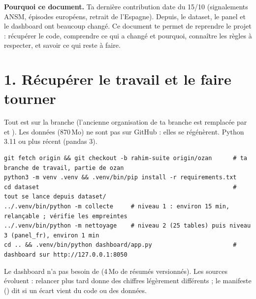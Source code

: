 \textbf{Pourquoi ce document.} Ta dernière contribution date du 15/10 (signalements ANSM, épisodes européens, retrait de l'Espagne).
Depuis, le dataset, le panel et le dashboard ont beaucoup changé. Ce document te permet de reprendre le projet : récupérer le code,
comprendre ce qui a changé et pourquoi, connaître les règles à respecter, et savoir ce qui reste à faire.

\section{1. Récupérer le travail et le faire tourner}
Tout est sur la branche  (l'ancienne organisation de ta branche est remplacée par  et ).
Les données (870\,Mo) ne sont pas sur GitHub : elles se régénèrent. Python 3.11 ou plus récent (pandas 3).
\begin{Verbatim}[fontsize=\small, frame=single, rulecolor=\color{gris!50}, framesep=2pt]
git fetch origin && git checkout -b rahim-suite origin/ozan      # ta branche de travail, partie de ozan
python3 -m venv .venv && .venv/bin/pip install -r requirements.txt
cd dataset                                                       # tout se lance depuis dataset/
../.venv/bin/python -m collecte     # niveau 1 : environ 15 min, relançable ; vérifie les empreintes
../.venv/bin/python -m nettoyage    # niveau 2 (25 tables) puis niveau 3 (panel_fr), environ 1 min
cd .. && .venv/bin/python dashboard/app.py                       # dashboard sur http://127.0.0.1:8050
\end{Verbatim}
Le dashboard n'a pas besoin de  (4\,Mo de résumés versionnés). Les sources évoluent : relancer plus tard donne
des chiffres légèrement différents ; le manifeste () dit si un écart vient du code ou des données.

